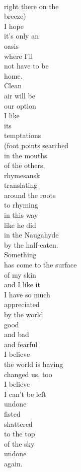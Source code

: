 \documentclass[smalldemyvopaper,11pt,twoside,onecolumn,openright,extrafontsizes]{memoir}
\begin{document}
\\right there on the
\\breeze)
\\I hope
\\it's only an
\\oasis
\\where I'll
\\not have to be
\\home.
\\Clean
\\air will be
\\our option
\\I like
\\its
\\temptations
\\(foot points searched
\\in the mouths
\\of the others,
\\rhymesansk
\\translating
\\around the roots
\\to rhyming
\\in this way
\\like he did
\\in the Naugahyde
\\by the half-eaten.
\\Something
\\has come to the surface
\\of my skin
\\and I like it
\\I have so much
\\appreciated
\\by the world
\\good
\\and bad
\\and fearful
\\I believe
\\the world is having
\\changed us, too
\\I believe
\\I can't be left
\\undone
\\fisted
\\shattered
\\to the top
\\of the sky
\\undone
\\again.
\end{document}
